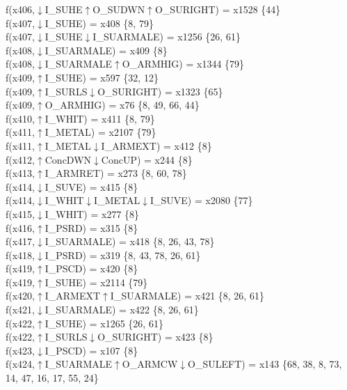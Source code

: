 f(x406,$\downarrow$I\_SUHE$\uparrow$O\_SUDWN$\uparrow$O\_SURIGHT) = x1528 \{44\} \\  
f(x407,$\downarrow$I\_SUHE) = x408 \{8, 79\} \\  
f(x407,$\downarrow$I\_SUHE$\downarrow$I\_SUARMALE) = x1256 \{26, 61\} \\  
f(x408,$\downarrow$I\_SUARMALE) = x409 \{8\} \\  
f(x408,$\downarrow$I\_SUARMALE$\uparrow$O\_ARMHIG) = x1344 \{79\} \\  
f(x409,$\uparrow$I\_SUHE) = x597 \{32, 12\} \\  
f(x409,$\uparrow$I\_SURLS$\downarrow$O\_SURIGHT) = x1323 \{65\} \\  
f(x409,$\uparrow$O\_ARMHIG) = x76 \{8, 49, 66, 44\} \\  
f(x410,$\uparrow$I\_WHIT) = x411 \{8, 79\} \\  
f(x411,$\uparrow$I\_METAL) = x2107 \{79\} \\  
f(x411,$\uparrow$I\_METAL$\downarrow$I\_ARMEXT) = x412 \{8\} \\  
f(x412,$\uparrow$ConcDWN$\downarrow$ConcUP) = x244 \{8\} \\  
f(x413,$\uparrow$I\_ARMRET) = x273 \{8, 60, 78\} \\  
f(x414,$\downarrow$I\_SUVE) = x415 \{8\} \\  
f(x414,$\downarrow$I\_WHIT$\downarrow$I\_METAL$\downarrow$I\_SUVE) = x2080 \{77\} \\  
f(x415,$\downarrow$I\_WHIT) = x277 \{8\} \\  
f(x416,$\uparrow$I\_PSRD) = x315 \{8\} \\  
f(x417,$\downarrow$I\_SUARMALE) = x418 \{8, 26, 43, 78\} \\  
f(x418,$\downarrow$I\_PSRD) = x319 \{8, 43, 78, 26, 61\} \\  
f(x419,$\uparrow$I\_PSCD) = x420 \{8\} \\  
f(x419,$\uparrow$I\_SUHE) = x2114 \{79\} \\  
f(x420,$\uparrow$I\_ARMEXT$\uparrow$I\_SUARMALE) = x421 \{8, 26, 61\} \\  
f(x421,$\downarrow$I\_SUARMALE) = x422 \{8, 26, 61\} \\  
f(x422,$\uparrow$I\_SUHE) = x1265 \{26, 61\} \\  
f(x422,$\uparrow$I\_SURLS$\downarrow$O\_SURIGHT) = x423 \{8\} \\  
f(x423,$\downarrow$I\_PSCD) = x107 \{8\} \\  
f(x424,$\uparrow$I\_SUARMALE$\uparrow$O\_ARMCW$\downarrow$O\_SULEFT) = x143 \{68, 38, 8, 73, 14, 47, 16, 17, 55, 24\} \\  
